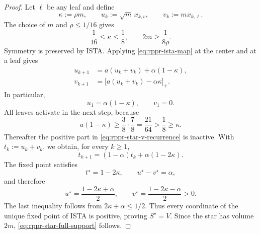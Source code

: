 \begin{proof}
Let \(\ell\) be any leaf and define
\begin{equation}
    \kappa:=\rho m,
    \qquad
    u_k:=\sqrt{m}\,x_{k,v},
    \qquad
    v_k:=m x_{k,\ell}.
    \label{eq:rppr-star-aggregate-coordinates}
\end{equation}
The choice of \(m\) and \(\rho\leq1/16\) gives
\begin{equation}
    \frac1{16}\leq\kappa\leq\frac18,
    \qquad
    2m\geq\frac1{8\rho}.
    \label{eq:rppr-kappa-range}
\end{equation}
Symmetry is preserved by ISTA.  Applying
\cref{eq:rppr-ista-map} at the center and at a leaf gives
\begin{align}
    u_{k+1}
    &=a(u_k+v_k)+\alpha(1-\kappa),
    \label{eq:rppr-star-u-recurrence}\\
    v_{k+1}
    &=\bigl[a(u_k+v_k)-\alpha\kappa\bigr]_+.
    \label{eq:rppr-star-v-recurrence}
\end{align}
In particular,
\[
    u_1=\alpha(1-\kappa),
    \qquad
    v_1=0.
\]
All leaves activate in the next step, because
\begin{equation}
    a(1-\kappa)
    \geq\frac38\cdot\frac78
    =\frac{21}{64}
    >\frac18
    \geq\kappa.
    \label{eq:rppr-star-leaf-activation}
\end{equation}
Thereafter the positive part in
\cref{eq:rppr-star-v-recurrence} is inactive.  With
\(t_k:=u_k+v_k\), we obtain, for every \(k\geq1\),
\begin{equation}
    t_{k+1}
    =(1-\alpha)t_k+\alpha(1-2\kappa).
    \label{eq:rppr-star-t-recurrence}
\end{equation}
The fixed point satisfies
\begin{equation}
    t^\star=1-2\kappa,
    \qquad
    u^\star-v^\star=\alpha,
    \label{eq:rppr-star-fixed-relations}
\end{equation}
and therefore
\begin{equation}
    u^\star=\frac{1-2\kappa+\alpha}{2},
    \qquad
    v^\star=\frac{1-2\kappa-\alpha}{2}>0.
    \label{eq:rppr-star-fixed-point}
\end{equation}
The last inequality follows from
\(2\kappa+\alpha\leq1/2\).  Thus every coordinate of the unique fixed point
of ISTA is positive, proving \(S^\star=V\).  Since the star has volume
\(2m\), \cref{eq:rppr-star-full-support} follows.


\end{proof}
